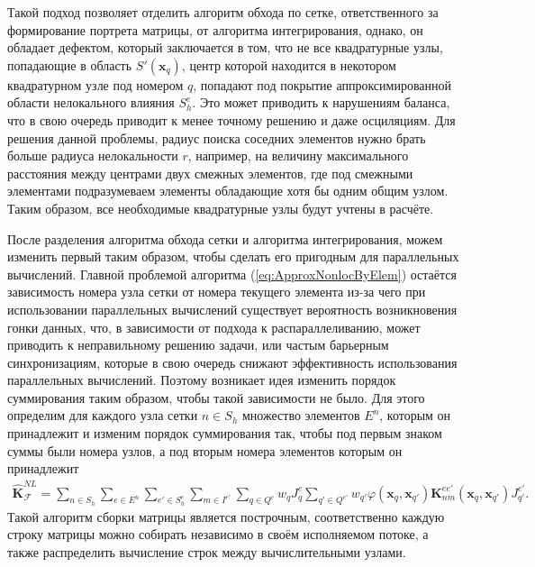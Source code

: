 Такой подход позволяет отделить алгоритм обхода по сетке, ответственного за формирование портрета матрицы, от алгоритма интегрирования, однако, он обладает дефектом, который заключается в том, что не все квадратурные узлы, попадающие в область $S'(\boldsymbol{x}_q)$, центр которой находится в некотором квадратурном узле под номером $q$, попадают под покрытие аппроксимированной области нелокального влияния $S_h^e$. Это может приводить к нарушениям баланса, что в свою очередь приводит к менее точному решению и даже осциляциям. Для решения данной проблемы, радиус поиска соседних элементов нужно брать больше радиуса нелокальности $r$, например, на величину максимального расстояния между центрами двух смежных элементов, где под смежными элементами подразумеваем элементы обладающие хотя бы одним общим узлом. Таким образом, все необходимые квадратурные узлы будут учтены в расчёте.

После разделения алгоритма обхода сетки и алгоритма интегрирования, можем изменить первый таким образом, чтобы сделать его пригодным для параллельных вычислений. Главной проблемой алгоритма (\ref{eq:ApproxNonlocByElem}) остаётся зависимость номера узла сетки от номера текущего элемента из-за чего при использовании параллельных вычислений существует вероятность возникновения гонки данных, что, в зависимости от подхода к распараллеливанию, может приводить к неправильному решению задачи, или частым барьерным синхронизациям, которые в свою очередь снижают эффективность использования параллельных вычислений. Поэтому возникает идея изменить порядок суммирования таким образом, чтобы такой зависимости не было. Для этого определим для каждого узла сетки $n \in S_h$ множество элементов $E^n$, которым он принадлежит и изменим порядок суммирования так, чтобы под первым знаком суммы были номера узлов, а под вторым номера элементов которым он принадлежит
\begin{gather}
	\label{eq:ApproxNonlocParallel}
	\widehat{\textbf{K}}^{NL}_{\mathcal{F}} =
	\sum\limits_{n \in S_h}
	\sum\limits_{e \in E^n}
	\sum\limits_{e' \in S_h^e}
	\sum\limits_{m \in I^{e'}}
	\sum\limits_{q \in Q^e}
	w_q J_q^e
	\sum\limits_{q' \in Q^{e'}}
	w_{q'} \varphi(\boldsymbol{x}_q, \boldsymbol{x}_{q'}) 
	\textbf{K}_{nm}^{e e'}(\boldsymbol{x}_q, \boldsymbol{x}_{q'}) J_{q'}^{e'}.
\end{gather}
Такой алгоритм сборки матрицы является построчным, соответственно каждую строку матрицы можно собирать независимо в своём исполняемом потоке, а также распределить вычисление строк между вычислительными узлами.

